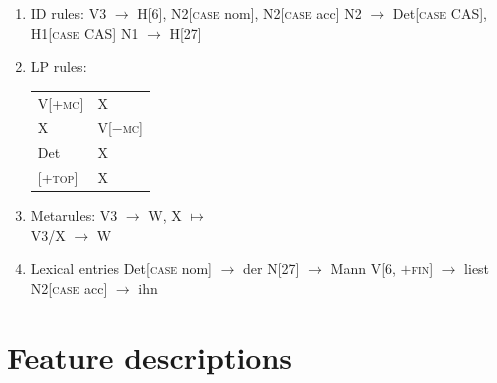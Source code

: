 \begin{enumerate}
\item ID rules:
\eal
\ex V3 $\to$ H[6], N2[\textsc{case} nom], N2[\textsc{case} acc] 
\ex N2 $\to$ Det[\textsc{case} CAS], H1[\textsc{case} CAS]
\ex N1 $\to$ H[27]
\zl
\item LP rules:
\ea
\begin{tabular}[t]{@{}l@{~$<$~}l@{}}
V[+\textsc{mc}]  & X\\
X       & V[$-$\textsc{mc}]\\
Det     & X\\
{}[+\textsc{top}] & X\\
\end{tabular}
\z
\pagebreak
\item Metarules:
\ea
V3  $\to$ W, X $\mapsto$\\
V3/X  $\to$ W
\z


\item Lexical entries
\eal
\ex Det[\textsc{case} nom] $\to$ der
\ex N[27] $\to$ Mann
\ex V[6, $+$\textsc{fin}] $\to$ liest
\ex N2[\textsc{case} acc] $\to$ ihn
\zl

\end{enumerate}

\section{Feature descriptions}

